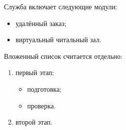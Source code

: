 Служба включает следующие модули:

\begin{itemize}
  \item удалённый заказ;
  \item виртуальный читальный зал.
\end{itemize}

Вложенный список считается отдельно:

\begin{enumerate}
  \item первый этап:
    \begin{itemize}
      \item подготовка;
      \item проверка.
    \end{itemize}
  \item второй этап.
\end{enumerate}
